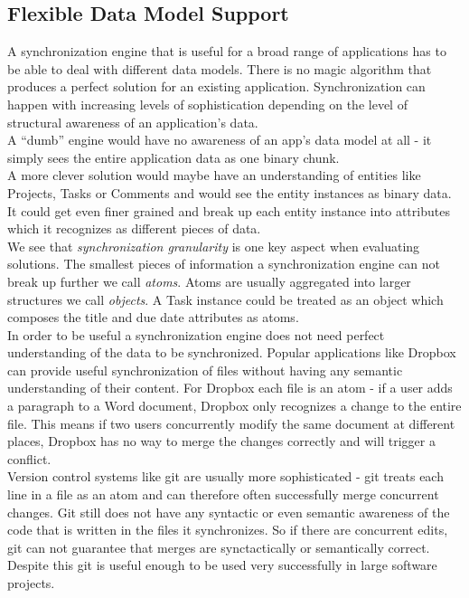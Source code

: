 \subsection{Flexible Data Model Support}
A synchronization engine that is useful for a broad range of applications has to be able to deal with different data models. There is no magic algorithm that produces a perfect solution for an existing application.
Synchronization can happen with increasing levels of sophistication depending on the level of structural awareness of an application's data.\\
A ``dumb'' engine would have no awareness of an app's data model at all - it simply sees the entire application data as one binary chunk.\\
A more clever solution would maybe have an understanding of entities like Projects, Tasks or Comments and would see the entity instances as binary data.\\
It could get even finer grained and break up each entity instance into attributes which it recognizes as different pieces of data.\\
We see that \emph{synchronization granularity} is one key aspect when evaluating solutions.
The smallest pieces of information a synchronization engine can not break up further we call \emph{atoms}.
Atoms are usually aggregated into larger structures we call \emph{objects}.
A Task instance could be treated as an object which composes the title and due date attributes as atoms.\\
In order to be useful a synchronization engine does not need perfect understanding of the data to be synchronized.
Popular applications like Dropbox can provide useful synchronization of files without having any semantic understanding of their content.
For Dropbox each file is an atom - if a user adds a paragraph to a Word document, Dropbox only recognizes a change to the entire file.
This means if two users concurrently modify the same document at different places, Dropbox has no way to merge the changes correctly and will trigger a conflict.\\
Version control systems like git are usually more sophisticated - git treats each line in a file as an atom and can therefore often successfully merge concurrent changes.
Git still does not have any syntactic or even semantic awareness of the code that is written in the files it synchronizes.
So if there are concurrent edits, git can not guarantee that merges are synctactically or semantically correct.
Despite this git is useful enough to be used very successfully in large software projects.\\

